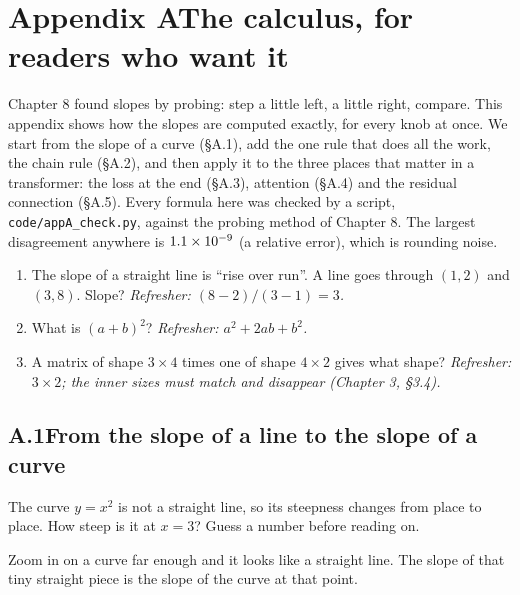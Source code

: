 \newpage
\section*{Appendix A\quad The calculus, for readers who want it}
\providecommand{\fitR}[1]{\leavevmode\setbox0\hbox{#1}\ifdim\wd0>\linewidth\resizebox{\linewidth}{!}{\box0}\else\box0\fi}

\begin{chaptermap}
Chapter 8 found slopes by probing: step a little left, a little right, compare. This appendix shows how the
slopes are computed exactly, for every knob at once. We start from the slope of a curve (\S A.1), add the one
rule that does all the work, the chain rule (\S A.2), and then apply it to the three places that matter in a
transformer: the loss at the end (\S A.3), attention (\S A.4) and the residual connection (\S A.5). Every
formula here was checked by a script, \texttt{code/appA\_check.py}, against the probing method of Chapter 8.
The largest disagreement anywhere is $1.1\times10^{-9}$ (a relative error), which is rounding noise.
\end{chaptermap}

\begin{beforeyoustart}
\begin{enumerate}[label=(\arabic*),leftmargin=1.6em]
\item The slope of a straight line is ``rise over run''. A line goes through $(1,2)$ and $(3,8)$. Slope?
\emph{Refresher: $(8-2)/(3-1)=3$.}
\item What is $(a+b)^2$? \emph{Refresher: $a^2+2ab+b^2$.}
\item A matrix of shape $3\times4$ times one of shape $4\times2$ gives what shape? \emph{Refresher: $3\times2$;
the inner sizes must match and disappear (Chapter 3, \S3.4).}
\end{enumerate}
\end{beforeyoustart}

\subsection*{A.1\quad From the slope of a line to the slope of a curve}

\Predict The curve $y=x^2$ is not a straight line, so its steepness changes from place to place. How steep is
it at $x=3$? Guess a number before reading on.

\Picture Zoom in on a curve far enough and it looks like a straight line. The slope of that tiny straight
piece is the slope of the curve at that point.

